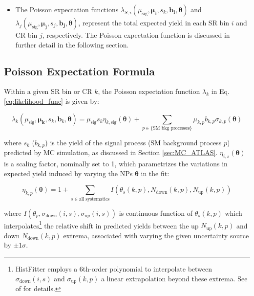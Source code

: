 \begin{itemize}
    \item The Poisson expectation functions \(\lambda_{S,i}(\mu_\text{sig}, \boldsymbol{\mu_i}, s_k, \boldsymbol{b_i}, \boldsymbol{\theta})\) and \(\lambda_j(\mu_\text{sig}, \boldsymbol{\mu_j}, s_j, \boldsymbol{b_j}, \boldsymbol{\theta})\), represent the total expected yield in each SR bin \(i\) and CR bin \(j\), respectively. The Poisson expectation function is discussed in further detail in the following section.
\end{itemize}

\subsection{Poisson Expectation Formula}
\label{sec:poisson_exp}

Within a given SR bin or CR \(k\), the Poisson expectation function \(\lambda_k\) in Eq. \ref{eq:likelihood_func} is given by:
    
\begin{equation}
\label{eq:lambda}
        \lambda_k(\mu_\text{sig}, \boldsymbol{\mu_k}, s_k, \boldsymbol{b}_k, \boldsymbol{\theta}) = \mu_\text{sig}s_k\eta_{k, \text{sig}}(\boldsymbol{\theta}) + \sum\limits_{p\in{\text{\{SM bkg processes\}}}} \mu_{k,p} b_{k,p}\sigma_{k,p}(\boldsymbol{\theta})
\end{equation}
    
\noindent where \(s_k\) (\(b_{k,p}\)) is the yield of the signal process (SM background process \(p\)) predicted by MC simulation, as discussed in Section \ref{sec:MC_ATLAS}. \(\eta_{i,s}(\boldsymbol{\theta})\) is a scaling factor, nominally set to 1, which parametrizes the variations in expected yield induced by varying the NPs \(\boldsymbol{\theta}\) in the fit:

        \begin{equation}
            \label{eq:sigma}
            \eta_{k,p}(\boldsymbol{\theta}) = 1 + \sum_{s\in\text{all systematics}}I(\theta_s(k,p), N_\text{down}(k,p), N_\text{up}(k,p))
        \end{equation}

        where \(I(\theta_p, \sigma_\text{down}(i,s), \sigma_{up}(i,s))\) is continuous function of \(\theta_s(k,p)\) which interpolates\footnote{HistFitter employs a 6th-order polynomial to interpolate between  \(\sigma_\text{down}(i,s)\) and \(\sigma_\text{up}(k,p)\) a linear extrapolation beyond these extrema. See  of  for details.} the relative shift in predicted yields between the up \(N_\text{up}(k, p)\) and down \(N_\text{down}(k, p)\) extrema, associated with varying the given uncertainty source by \(\pm1\sigma\). 

